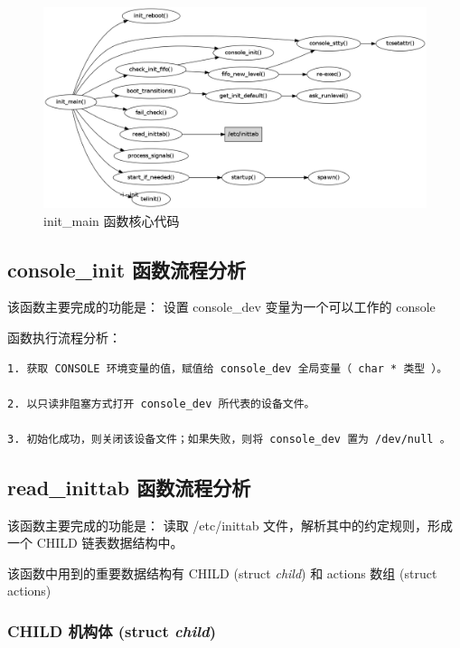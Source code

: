 \begin{figure}[htbp]
\centering
\includegraphics{./figures/init_main.png}
\caption{init\_main 函数核心代码}
\end{figure}

\subsection{console\_init 函数流程分析}

该函数主要完成的功能是： 设置 console\_dev 变量为一个可以工作的 console

函数执行流程分析：

{\begin{shaded}\begin{verbatim}
1. 获取 CONSOLE 环境变量的值，赋值给 console_dev 全局变量（ char * 类型 ）。

2. 以只读非阻塞方式打开 console_dev 所代表的设备文件。

3. 初始化成功，则关闭该设备文件；如果失败，则将 console_dev 置为 /dev/null 。
\end{verbatim}\end{shaded}}
\subsection{read\_inittab 函数流程分析}

该函数主要完成的功能是： 读取 /etc/inittab
文件，解析其中的约定规则，形成一个 CHILD 链表数据结构中。

该函数中用到的重要数据结构有 CHILD (struct \emph{child}) 和 actions 数组
(struct actions)

\subsubsection{CHILD 机构体 (struct \emph{child})}

